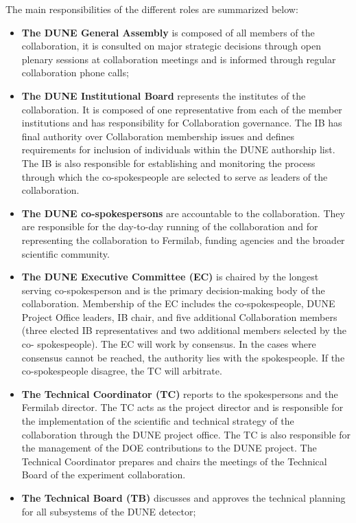The main responsibilities of the different roles are summarized below:
\begin{itemize}
  \item \textbf{The DUNE General Assembly} is composed of all members of the collaboration, it is consulted on major strategic decisions 
    through open plenary sessions at collaboration meetings and is informed through regular collaboration phone calls;
  \item \textbf{The DUNE Institutional Board} represents the institutes of the collaboration. It is composed of one representative from each 
    of the member institutions and has responsibility for Collaboration governance.  The IB has final authority over Collaboration 
    membership issues and defines requirements for inclusion of individuals within the DUNE authorship list. The IB is also responsible    
    for establishing and monitoring the process through which the co-spokespeople are selected to serve as leaders of the collaboration.   
  \item \textbf{The DUNE co-spokespersons} are accountable to the collaboration. They 
    are responsible for the day-to-day running of the collaboration and for representing the collaboration to Fermilab, funding 
    agencies and the broader scientific community.
  \item \textbf{The DUNE Executive Committee (EC)} is chaired by the longest serving co-spokesperson and is the primary 
    decision-making body of the collaboration. Membership of the EC includes the co-spokespeople, DUNE Project Office leaders, IB 
    chair, and five additional Collaboration members (three elected IB representatives and two additional members selected by the co-
    spokespeople). The EC will work by consensus. In the cases where consensus cannot be reached, 
    the authority lies with the spokespeople. If the co-spokespeople disagree, the TC will arbitrate.
  \item \textbf{The Technical Coordinator (TC)} reports to the spokespersons and the Fermilab director. 
     The TC acts as the project director 
    and is responsible for the implementation of the scientific and technical strategy of the collaboration through the DUNE project office.
    The TC is also responsible for the management of the DOE contributions to the DUNE project.  
     The Technical Coordinator prepares and chairs the meetings of the Technical Board of the experiment collaboration.
     \item \textbf{The Technical Board (TB)} discusses and approves the technical planning for all subsystems of the DUNE detector;

\end{itemize}
